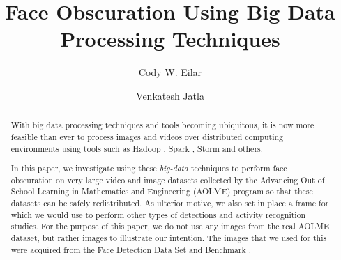 \documentclass[
	submission,
	final,
	notitlepage,
	narroweqnarray,
	inline,
	twoside,
	]{ieee}
\begin{document}
\title{Face Obscuration Using Big Data Processing Techniques}

\author[EILAR AND VENKATESH]{Cody W. Eilar
       \and{} Venkatesh Jatla 
}


\maketitle               

\begin{abstract} 
  With big data processing techniques and tools becoming ubiquitous, it
  is now more feasible than ever to process images and videos over 
  distributed computing environments using tools such as Hadoop \cite{hadoop}, Spark \cite{spark}, Storm \cite{storm} and others. 

  In this paper, we investigate 
  using these \textit{big-data} techniques to perform face obscuration on very large
  video and image datasets collected by the Advancing Out of School Learning in 
  Mathematics and Engineering (AOLME) program so that these datasets can be 
  safely redistributed. As ulterior motive, we also set in place a frame for
  which we would use to perform other types of detections and activity 
  recognition studies. For the purpose of this paper, we do not use any images
  from the real AOLME dataset, but rather images to illustrate our intention.
  The images that we used for this were acquired from the Face Detection Data Set 
  and Benchmark \cite{fddbTech}.
\end{abstract}
\end{document}
